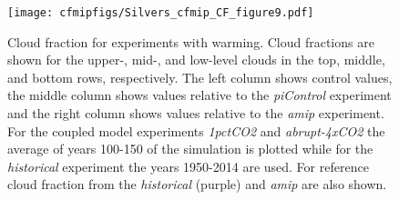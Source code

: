 \documentclass[draft]{agujournal2019}
\begin{document}
\begin{figure}
  \centering
  \texttt{[image: cfmipfigs/Silvers\_cfmip\_CF\_figure9.pdf]}
  \caption{Cloud fraction for experiments with warming.  Cloud fractions are shown for the upper-, mid-, and low-level 
  clouds in the top, middle, and bottom rows, respectively.  The left column shows control values, the middle column
  shows values relative to the \textit{piControl} experiment and the right column
  shows values relative to the \textit{amip} experiment.  For the coupled model experiments
 \textit{1pctCO2} and \textit{abrupt-4xCO2} the average of years 100-150 of the simulation is plotted while for the 
 \textit{historical} experiment the years 1950-2014 are used.  
  For reference cloud fraction from the 
 \textit{historical} (purple) and \textit{amip} are also shown.}
  \label{fig:CF_warming}
\end{figure}
\end{document}

